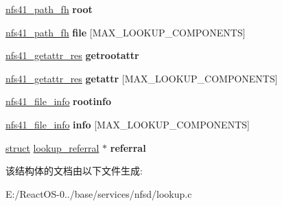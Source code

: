 \begin{DoxyCompactItemize}
\hyperlink{struct____nfs41__path__fh}{nfs41\+\_\+path\+\_\+fh} {\bfseries root}
\item 
\mbox{\label{struct____nfs41__lookup__component__res_a984b62d1f9e65877b098d33df2655200}} 
\hyperlink{struct____nfs41__path__fh}{nfs41\+\_\+path\+\_\+fh} {\bfseries file} \mbox{[}M\+A\+X\+\_\+\+L\+O\+O\+K\+U\+P\+\_\+\+C\+O\+M\+P\+O\+N\+E\+N\+TS\mbox{]}
\item 
\mbox{\label{struct____nfs41__lookup__component__res_a3675d850386f9876a0773309e4f3cc45}} 
\hyperlink{struct____nfs41__getattr__res}{nfs41\+\_\+getattr\+\_\+res} {\bfseries getrootattr}
\item 
\mbox{\label{struct____nfs41__lookup__component__res_a1b0dee2acd0d0bc43eee1eead9f545aa}} 
\hyperlink{struct____nfs41__getattr__res}{nfs41\+\_\+getattr\+\_\+res} {\bfseries getattr} \mbox{[}M\+A\+X\+\_\+\+L\+O\+O\+K\+U\+P\+\_\+\+C\+O\+M\+P\+O\+N\+E\+N\+TS\mbox{]}
\item 
\mbox{\label{struct____nfs41__lookup__component__res_af5e326d474f49bc14e506664510af02a}} 
\hyperlink{struct____nfs41__file__info}{nfs41\+\_\+file\+\_\+info} {\bfseries rootinfo}
\item 
\mbox{\label{struct____nfs41__lookup__component__res_a494b1adffc4254aa46c2436271de2ecb}} 
\hyperlink{struct____nfs41__file__info}{nfs41\+\_\+file\+\_\+info} {\bfseries info} \mbox{[}M\+A\+X\+\_\+\+L\+O\+O\+K\+U\+P\+\_\+\+C\+O\+M\+P\+O\+N\+E\+N\+TS\mbox{]}
\item 
\mbox{\label{struct____nfs41__lookup__component__res_af84d33d1fb1beff380ed4366fc36dfb5}} 
\hyperlink{interfacestruct}{struct} \hyperlink{structlookup__referral}{lookup\+\_\+referral} $\ast$ {\bfseries referral}
\end{DoxyCompactItemize}


该结构体的文档由以下文件生成\+:\begin{DoxyCompactItemize}
\item 
E\+:/\+React\+O\+S-\/0../base/services/nfsd/lookup.\+c\end{DoxyCompactItemize}
